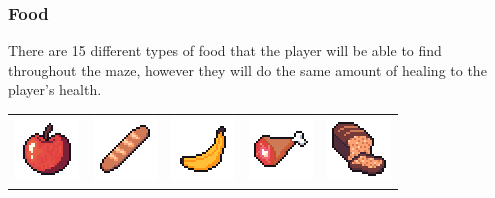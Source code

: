 \documentclass[../Main.tex]{subfiles}
\begin{document}
\begin{center}
\begin{tabular}{ | m{} | m{} | m{} |  m{} | m{} | }
                    \hline
                \end{tabular}
            \end{center}
        \clearpage
        \subsubsection{Food}
            There are 15 different types of food that the player will be able to find throughout the maze, however they will do the same amount of healing to the player's health.
            \begin{center}
                \begin{tabular}{ m{} m{} m{} m{} m{} }
                    \centerline{\includegraphics{../res/textures/items/potions/food/Apple.png}} & \centerline{\includegraphics{../res/textures/items/potions/food/Baguette.png}} & \centerline{\includegraphics{../res/textures/items/potions/food/Banana.png}} & \centerline{\includegraphics{../res/textures/items/potions/food/Boar.png}} & \centerline{\includegraphics{../res/textures/items/potions/food/Bread.png}} \\

\end{tabular}
\end{center}
\end{document}

